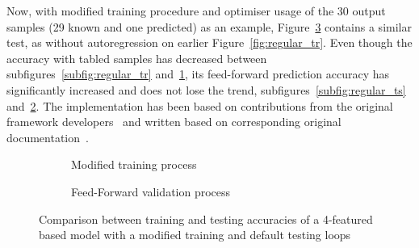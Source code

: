%
%
Now, with modified training procedure and optimiser usage of the 30 output samples (29 known and one predicted) as an example, \mbox{Figure~\ref{fig:modefied_tr}} contains a similar test, as without autoregression on earlier Figure~\ref{fig:regular_tr}.
Even though the accuracy with tabled samples has decreased between subfigures~\ref{subfig:regular_tr} and~\ref{subfig:modefied_tr}, its feed-forward prediction accuracy has significantly increased and does not lose the trend, subfigures~\ref{subfig:regular_ts} and~\ref{subfig:modefied_ts}.
The implementation has been based on contributions from the original framework developers~\cite{time_2020} and written based on corresponding original documentation~\cite{tensorflow2015-whitepaper}.
 {
\begin{figure}[htbp]
    \centering
    \begin{subfigure}[b]{\columnwidth}
        \centering
        
        \caption{Modified training process}
        \label{subfig:modefied_tr}
    \end{subfigure}
    \begin{subfigure}[b]{\columnwidth}
        \centering
        
        \caption{Feed-Forward validation process}
        \label{subfig:modefied_ts}
    \end{subfigure}
    \caption{Comparison between training and testing accuracies of a 4-featured based model with a modified training and default testing loops}
    \label{fig:modefied_tr}
\end{figure}
}
